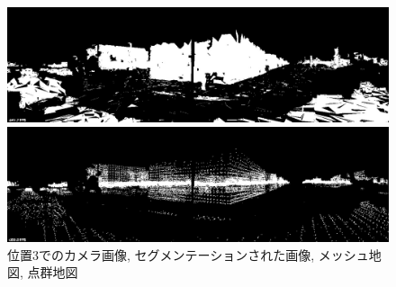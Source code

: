 \begin{figure}[htbp]
\begin{minipage}[b]{0.50\hsize}
\begin{center}
  \end{center}
 \end{minipage} \\
   \begin{minipage}[b]{0.50\hsize}
 \begin{center}
  \includegraphics[keepaspectratio, scale=0.18]{./picture/valued_mesh_map_image/image2.jpg}
  \end{center}
 \end{minipage}
 \begin{minipage}[b]{0.50\hsize}
 \begin{center}
  \includegraphics[keepaspectratio, scale=0.18]{./picture/valued_point_map_image/image2.jpg}
  \end{center}
 \end{minipage}
 \caption{位置3でのカメラ画像, セグメンテーションされた画像, メッシュ地図, 点群地図}\label{fig:place3}
\end{figure}


